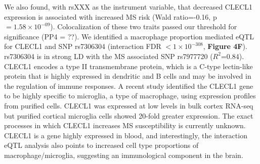We also found, with rsXXX as the instrument variable, that decreased CLECL1 expression is associated with increased MS risk (Wald ratio=-0.16, p$= 1.58 \times 10^{-09}$). Colocalization of these two traits passed our threshold for significance (PP4 = ??). We identified a macrophage proportion mediated eQTL for CLECL1 and SNP rs7306304 (interaction FDR $< 1 \times 10^{-308}$, \textbf{Figure 4F}). rs7306304 is in strong LD with the MS associated SNP rs7977720 ($R^2$=0.84)\cite{consortium*+MultipleSclerosisGenomic2019}. CLECL1 encodes a type II transmembrane protein, which is a C-type lectin-like protein that is highly expressed in dendritic and B cells and may be involved in the regulation of immune responses\cite{vanluijnMultipleSclerosisassociatedCLEC16A2015}. A recent study identified the CLECL1 gene to be highly specific to microglia, a type of macrophage, using expression profiles from purified cells. CLECL1 was expressed at low levels in bulk cortex RNA-seq but purified cortical microglia cells showed 20-fold greater expression\cite{vanluijnMultipleSclerosisassociatedCLEC16A2015}. The exact processes in which CLECL1 increases MS susceptibility is currently unknown. CLECL1 is a gene highly expressed in blood, and interestingly, the interaction eQTL analysis also points to increased cell type proportions of macrophage/microglia, suggesting an immunological component in the brain.  

